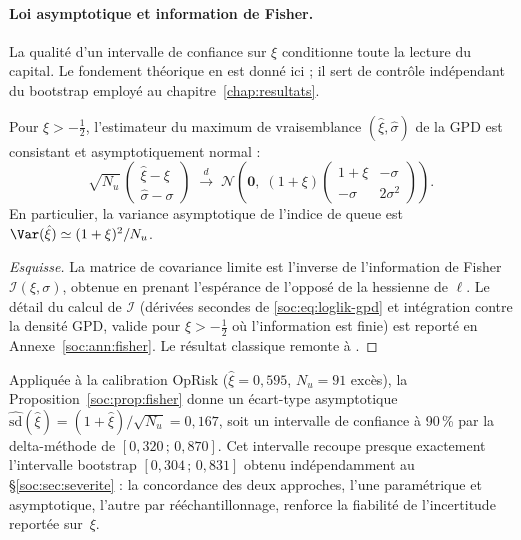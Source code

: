 \paragraph{Loi asymptotique et information de Fisher.} La qualité d'un intervalle de confiance sur $\xi$ conditionne toute la lecture du capital. Le fondement théorique en est donné ici ; il sert de contrôle indépendant du bootstrap employé au chapitre~\ref{chap:resultats}.

\begin{proposition}\label{soc:prop:fisher}
Pour $\xi > -\tfrac{1}{2}$, l'estimateur du maximum de vraisemblance $(\hat\xi,\hat\sigma)$ de la GPD est consistant et asymptotiquement normal :
\begin{equation}
\sqrt{N_u}\,\begin{pmatrix}\hat\xi-\xi\\[2pt]\hat\sigma-\sigma\end{pmatrix}
\;\xrightarrow{\;d\;}\;
\mathcal{N}\!\left(\mathbf{0},\; (1+\xi)\begin{pmatrix}1+\xi & -\sigma\\[2pt] -\sigma & 2\sigma^2\end{pmatrix}\right).
\end{equation}
En particulier, la variance asymptotique de l'indice de queue est
$\Var(\hat\xi)\simeq (1+\xi)^2/N_u$.
\end{proposition}

\begin{proof}[Esquisse]
La matrice de covariance limite est l'inverse de l'information de Fisher $\mathcal{I}(\xi,\sigma)$, obtenue en prenant l'espérance de l'opposé de la hessienne de $\ell$. Le détail du calcul de $\mathcal{I}$ (dérivées secondes de \eqref{soc:eq:loglik-gpd} et intégration contre la densité GPD, valide pour $\xi>-\tfrac12$ où l'information est finie) est reporté en Annexe~\ref{soc:ann:fisher}. Le résultat classique remonte à \citet{smith1987}.
\end{proof}

\noindent Appliquée à la calibration OpRisk ($\hat\xi=0{,}595$, $N_u=91$ excès), la Proposition~\ref{soc:prop:fisher} donne un écart-type asymptotique $\widehat{\mathrm{sd}}(\hat\xi)=(1+\hat\xi)/\sqrt{N_u}=0{,}167$, soit un intervalle de confiance à 90\,\% par la delta-méthode de $[0{,}320\,;\,0{,}870]$. Cet intervalle recoupe presque exactement l'intervalle bootstrap $[0{,}304\,;\,0{,}831]$ obtenu indépendamment au \S\ref{soc:sec:severite} : la concordance des deux approches, l'une paramétrique et asymptotique, l'autre par rééchantillonnage, renforce la fiabilité de l'incertitude reportée sur~$\xi$.

